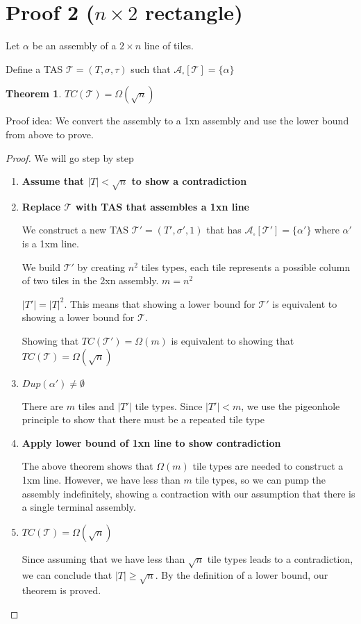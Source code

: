 \documentclass[12pt]{article}
\newtheorem{theorem}{Theorem}
\begin{document}
\section*{Proof 2 ($n \times 2 $ rectangle)}

Let $\alpha$ be an assembly of a $2 \times n$ line of tiles.

Define a TAS $\mathcal{T} = (T, \sigma, \tau)$ such that $\mathcal{A}_\square[\mathcal{T}] = \{ \alpha \}$

\begin{theorem}
	$TC(\mathcal{T}) = \Omega(\sqrt{n})$
\end{theorem}

Proof idea: We convert the assembly to a 1xn assembly and use the lower bound from above to prove. 

\begin{proof}
		We will go step by step
	\begin{enumerate}

		\item \textbf{Assume that $|T| < \sqrt{n}$ to show a contradiction}

        \item \textbf{Replace $\mathcal{T}$ with TAS that assembles a 1xn line}

            We construct a new TAS $\mathcal{T}' = (T', \sigma', 1)$ that has $\mathcal{A}_\square[\mathcal{T}'] = \{ \alpha' \}$ where $\alpha'$ is a 1xm line.

            We build $\mathcal{T}'$ by creating $n^2$ tiles types, each tile represents a possible column of two tiles in the 2xn assembly. $m = n^2$

            $|T'| = |T|^2$. This means that showing a lower bound for $\mathcal{T}'$ is equivalent to showing a lower bound for $\mathcal{T}$.

            Showing that $TC(\mathcal{T}') = \Omega(m)$ is equivalent to showing that $TC(\mathcal{T}) = \Omega(\sqrt{n})$


		\item \textbf{$Dup(\alpha') \neq \emptyset$}

            There are $m$ tiles and $|T'|$ tile types. Since $|T'| < m$, we use the pigeonhole principle to show that there must be a repeated tile type

		\item \textbf{Apply lower bound of 1xn line to show contradiction}

            The above theorem shows that $\Omega(m)$ tile types are needed to construct a 1xm line. However, we have less than $m$ tile types, so we can pump the assembly indefinitely, showing a contraction with our assumption that there is a single terminal assembly.

		\item \textbf{$TC(\mathcal{T}) = \Omega(\sqrt{n})$}

            Since assuming that we have less than $\sqrt{n}$ tile types leads to a contradiction, we can conclude that $|T| \geq \sqrt{n}$. By the definition of a lower bound, our theorem is proved.

	\end{enumerate}
\end{proof}
\end{document}

